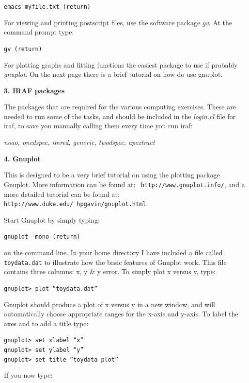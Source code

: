 \documentclass[12pt]{article}
\begin{document}
{\tt emacs myfile.txt (return)}         

For viewing and printing postscript files, use the software package
{\it gv}. At the command prompt type:

{\tt gv (return)}

For plotting graphs and fitting functions the easiest package to use
if probably {\it gnuplot}. On the next page there is a brief tutorial
on how do use gnuplot.\\

\newpage
\begin{center}
{\large{\bf 3. IRAF packages}}
\end{center}

The packages that are required for the various computing exercises.  These are needed to run some of the tasks, and should be included in the {\it login.cl} file for {\sc iraf}, to save you manually calling them every time you run {\sc iraf}:

{\it noao, onedspec, imred, generic, twodspec, apextract} \\

\newpage

\begin{center}
{\large{\bf 4. Gnuplot}}
\end{center}
This is designed to be a very brief tutorial on using the plotting
package Gnuplot. More information can be found at: {\tt
http://www.gnuplot.info/}, and a more detailed tutorial can be found
at: {\tt http://www.duke.edu/~hpgavin/gnuplot.html}.

Start Gnuplot by simply typing:

{\tt gnuplot -mono (return)}

on the command line. In your home directory I have included a file
called {\tt toydata.dat} to illustrate how the basic features of
Gnuplot work. This file contains three columns: x, y \& y error. 
To simply plot x versus y, type:

{\tt gnuplot> plot ``toydata.dat''}

Gnuplot should produce a plot of x versus y in a new window, and will
automatically choose appropriate ranges for the x-axis and y-axis. To
label the axes and to add a title type:

{\tt gnuplot> set xlabel ``x''}\\
{\tt gnuplot> set ylabel ``y''}\\
{\tt gnuplot> set title ``toydata plot''}

If you now type:
\end{document}
